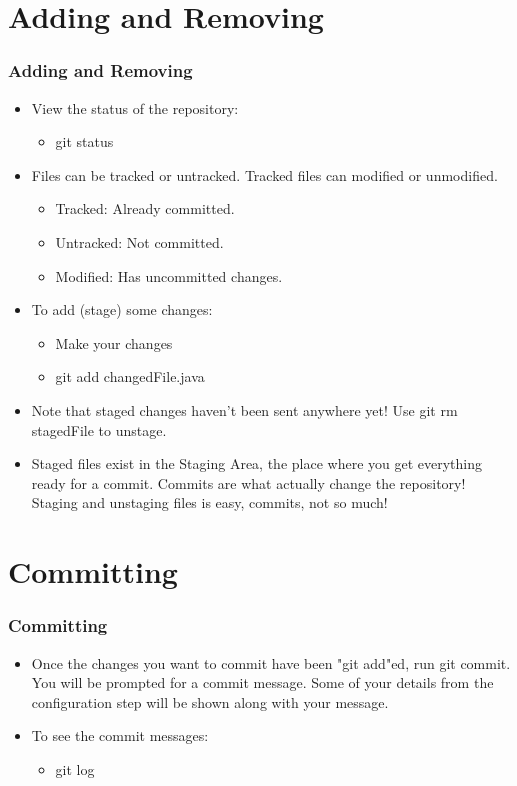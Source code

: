 \documentclass{beamer}
\begin{document}
\section{Adding and Removing}
\begin{frame}
\frametitle{Adding and Removing}
\begin{itemize}
\pause
\item View the status of the repository:
	\begin{itemize}
	\pause
	\item git status
	\end{itemize}
\pause
\item Files can be tracked or untracked. Tracked files can modified or
unmodified.
	\begin{itemize}
	\pause
	\item Tracked: Already committed.
	\pause
	\item Untracked: Not committed.
	\pause
	\item Modified: Has uncommitted changes.
	\end{itemize}
\pause
\item To add (stage) some changes:
	\begin{itemize}
	\pause
	\item Make your changes
	\pause
	\item git add changedFile.java
	\end{itemize}
\pause
\item Note that staged changes haven't been sent anywhere yet! Use git rm
stagedFile to unstage.
\pause
\item Staged files exist in the Staging Area, the place where you get everything
ready for a commit. Commits are what actually change the repository! Staging and
unstaging files is easy, commits, not so much!
\end{itemize}
\end{frame}


\section{Committing}
\begin{frame}
\frametitle{Committing}
\begin{itemize}
\pause
\item Once the changes you want to commit have been "git add"ed, run git commit.
You will be prompted for a commit message. Some of your details from the
configuration step will be shown along with your message.
\pause
\item To see the commit messages:
	\begin{itemize}
	\pause
	\item git log
	\end{itemize}
\end{itemize}
\end{frame}
\end{document}
